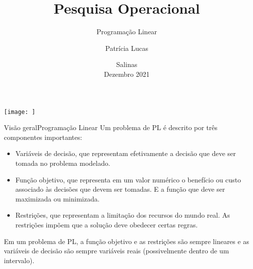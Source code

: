 \documentclass[t]{beamer}
\title[]{Pesquisa Operacional}
\subtitle[]{Programação Linear}
\author[]{Patrícia Lucas\\{\footnotesize }}
\institute{Bacharelado em Sistemas de Informação \\ IFNMG  - Campus Salinas}
\date{\scriptsize Salinas\\Dezembro 2021}
\begin{document}
\begin{frame}

\begin{center}
\texttt{[image: ]}
\end{center}
  \titlepage
\end{frame}



\begin{ftst}{Visão geral}{Programação Linear}
Um problema de PL é descrito por três componentes importantes:
\small
\begin{itemize}
    \item Variáveis de decisão, que representam efetivamente a decisão que deve ser tomada no problema modelado.
    \vone
    \item Função objetivo, que representa em um valor numérico o benefício ou custo associado às decisões que devem ser tomadas. E a função que deve ser maximizada ou minimizada.
    \item Restrições, que representam a limitação dos recursos do mundo real. As restrições impõem que a solução deve obedecer certas regras.
\end{itemize}
\vone
\normalsize
Em um problema de PL, a função objetivo e as restrições são sempre lineares e as variáveis
de decisão são sempre variáveis reais (possivelmente dentro de um intervalo).

\end{ftst}

\end{document}
